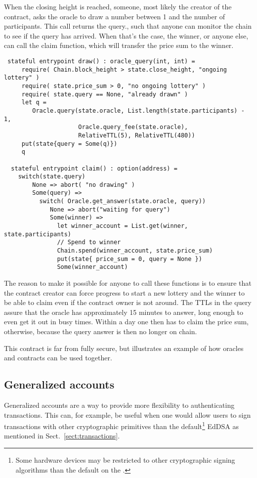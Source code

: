 When the closing height is reached, someone, most likely the creator
of the contract, asks the oracle to draw a number between 1 and the
number of participants. This call returns the query., such that anyone
can monitor the chain to see if the query has arrived. When that's the
case, the winner, or anyone else, can call the claim function, which
will transfer the price sum to the winner.
\begin{verbatim}
 stateful entrypoint draw() : oracle_query(int, int) =
     require( Chain.block_height > state.close_height, "ongoing lottery" )
     require( state.price_sum > 0, "no ongoing lottery" )
     require( state.query == None, "already drawn" )
     let q =
        Oracle.query(state.oracle, List.length(state.participants) - 1,
                     Oracle.query_fee(state.oracle),
                     RelativeTTL(5), RelativeTTL(480))
     put(state{query = Some(q)})
     q

  stateful entrypoint claim() : option(address) =
    switch(state.query)
        None => abort( "no drawing" )
        Some(query) =>
          switch( Oracle.get_answer(state.oracle, query))
             None => abort("waiting for query")
             Some(winner) =>
               let winner_account = List.get(winner, state.participants)
               // Spend to winner
               Chain.spend(winner_account, state.price_sum)
               put(state{ price_sum = 0, query = None })
               Some(winner_account)
\end{verbatim}

The reason to make it possible for anyone to call these functions is
to ensure that the contract creator can force progress to start a new
lottery and the winner to be able to claim even if the contract owner
is not around. The TTLs in the query assure that the oracle has
approximately 15 minutes to answer, long enough to even get it out
in busy times. Within a day one then has to claim the price sum,
otherwise, because the query answer is then no longer on chain.

This contract is far from fully secure, but illustrates an example of
how oracles and contracts can be used together.

\subsection{Generalized accounts}
\label{sect:ga}

Generalized accounts are a way to provide more flexibility to authenticating
transactions. This can, for example, be useful when one would allow users to
sign transactions with other cryptographic primitives than the
default\footnote{Some hardware devices may be restricted to other cryptographic
signing algorithms than the default on the \blockchain.} EdDSA as mentioned in
Sect.\ \ref{sect:transactions}.

